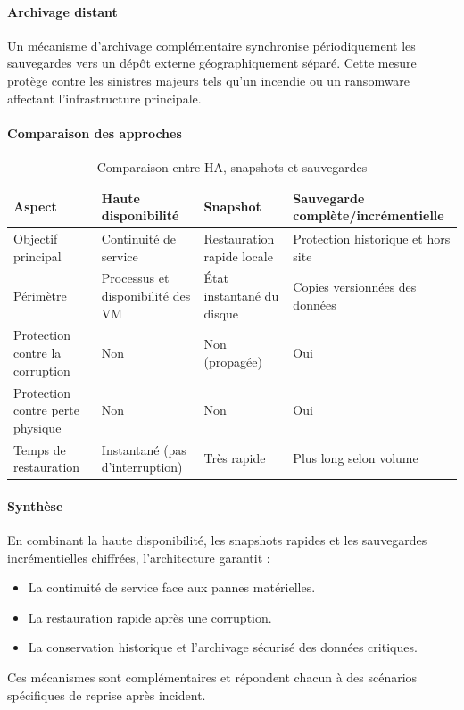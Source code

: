 \paragraph{Archivage distant}
Un mécanisme d’archivage complémentaire synchronise périodiquement les sauvegardes vers un dépôt externe géographiquement séparé. Cette mesure protège contre les sinistres majeurs tels qu’un incendie ou un ransomware affectant l’infrastructure principale.

\paragraph{Comparaison des approches}
\begin{table}[H]
	\renewcommand{\arraystretch}{1.3}
	\centering
	\begin{tabular}{|p{4cm}|p{4cm}|p{4cm}|p{4cm}|}
		\hline
		\textbf{Aspect}                  & \textbf{Haute disponibilité}      & \textbf{Snapshot}          & \textbf{Sauvegarde complète/incrémentielle} \\
		\hline
		Objectif principal               & Continuité de service             & Restauration rapide locale & Protection historique et hors site          \\
		\hline
		Périmètre                        & Processus et disponibilité des VM & État instantané du disque  & Copies versionnées des données              \\
		\hline
		Protection contre la corruption  & Non                               & Non (propagée)             & Oui                                         \\
		\hline
		Protection contre perte physique & Non                               & Non                        & Oui                                         \\
		\hline
		Temps de restauration            & Instantané (pas d’interruption)   & Très rapide                & Plus long selon volume                      \\
		\hline
	\end{tabular}
	\caption{Comparaison entre HA, snapshots et sauvegardes}
\end{table}

\paragraph{Synthèse}
En combinant la haute disponibilité, les snapshots rapides et les sauvegardes incrémentielles chiffrées, l’architecture garantit :
\begin{itemize}
	\item La continuité de service face aux pannes matérielles.
	\item La restauration rapide après une corruption.
	\item La conservation historique et l’archivage sécurisé des données critiques.
\end{itemize}
Ces mécanismes sont complémentaires et répondent chacun à des scénarios spécifiques de reprise après incident.

